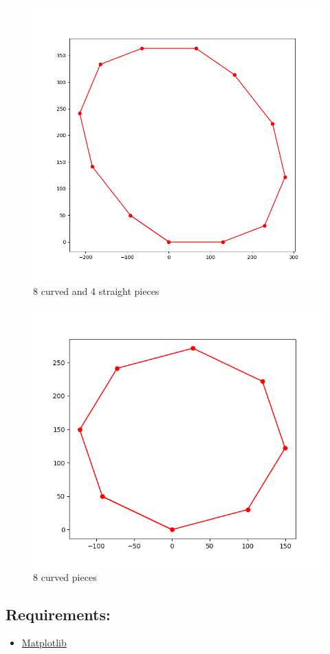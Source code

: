 \documentclass[a4paper, 12pt]{article}
\begin{document}
\begin{figure}
    \centering
    \includegraphics[scale=0.5]{Figure_2.png}
    \caption{8 curved and 4 straight pieces}
\end{figure}

\begin{figure}
    \centering
    \includegraphics[scale=0.6]{Figure_1.png}
    \caption{8 curved pieces}
\end{figure}

\subsection*{Requirements:}
\begin{itemize}
    \item \href{https://matplotlib.org/users/installing.html}{Matplotlib}
\end{itemize}
\end{document}

